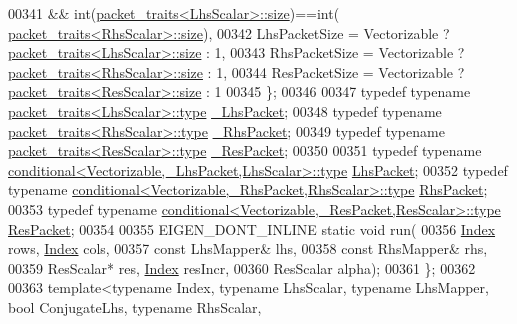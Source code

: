 \begin{DoxyCode}
{00341               && int(\hyperlink{struct_eigen_1_1internal_1_1packet__traits}{packet\_traits<LhsScalar>::size})==int(
      \hyperlink{struct_eigen_1_1internal_1_1packet__traits}{packet\_traits<RhsScalar>::size}),
00342   LhsPacketSize = Vectorizable ? \hyperlink{struct_eigen_1_1internal_1_1packet__traits}{packet\_traits<LhsScalar>::size} : 1,
00343   RhsPacketSize = Vectorizable ? \hyperlink{struct_eigen_1_1internal_1_1packet__traits}{packet\_traits<RhsScalar>::size} : 1,
00344   ResPacketSize = Vectorizable ? \hyperlink{struct_eigen_1_1internal_1_1packet__traits}{packet\_traits<ResScalar>::size} : 1
00345 \};
00346 
00347 \textcolor{keyword}{typedef} \textcolor{keyword}{typename} \hyperlink{group___sparse_core___module}{packet\_traits<LhsScalar>::type}  
      \hyperlink{group___sparse_core___module}{\_LhsPacket};
00348 \textcolor{keyword}{typedef} \textcolor{keyword}{typename} \hyperlink{group___sparse_core___module}{packet\_traits<RhsScalar>::type}  
      \hyperlink{group___sparse_core___module}{\_RhsPacket};
00349 \textcolor{keyword}{typedef} \textcolor{keyword}{typename} \hyperlink{group___sparse_core___module}{packet\_traits<ResScalar>::type}  
      \hyperlink{group___sparse_core___module}{\_ResPacket};
00350 
00351 \textcolor{keyword}{typedef} \textcolor{keyword}{typename} \hyperlink{class_eigen_1_1internal_1_1_tensor_lazy_evaluator_writable}{conditional<Vectorizable,\_LhsPacket,LhsScalar>::type}
       \hyperlink{class_eigen_1_1internal_1_1_tensor_lazy_evaluator_writable}{LhsPacket};
00352 \textcolor{keyword}{typedef} \textcolor{keyword}{typename} \hyperlink{class_eigen_1_1internal_1_1_tensor_lazy_evaluator_writable}{conditional<Vectorizable,\_RhsPacket,RhsScalar>::type}
       \hyperlink{class_eigen_1_1internal_1_1_tensor_lazy_evaluator_writable}{RhsPacket};
00353 \textcolor{keyword}{typedef} \textcolor{keyword}{typename} \hyperlink{class_eigen_1_1internal_1_1_tensor_lazy_evaluator_writable}{conditional<Vectorizable,\_ResPacket,ResScalar>::type}
       \hyperlink{class_eigen_1_1internal_1_1_tensor_lazy_evaluator_writable}{ResPacket};
00354 
00355 EIGEN\_DONT\_INLINE \textcolor{keyword}{static} \textcolor{keywordtype}{void} run(
00356   \hyperlink{namespace_eigen_a62e77e0933482dafde8fe197d9a2cfde}{Index} rows, \hyperlink{namespace_eigen_a62e77e0933482dafde8fe197d9a2cfde}{Index} cols,
00357   \textcolor{keyword}{const} LhsMapper& lhs,
00358   \textcolor{keyword}{const} RhsMapper& rhs,
00359         ResScalar* res, \hyperlink{namespace_eigen_a62e77e0933482dafde8fe197d9a2cfde}{Index} resIncr,
00360   ResScalar alpha);
00361 \};
00362 
00363 \textcolor{keyword}{template}<\textcolor{keyword}{typename} Index, \textcolor{keyword}{typename} LhsScalar, \textcolor{keyword}{typename} LhsMapper, \textcolor{keywordtype}{bool} ConjugateLhs, \textcolor{keyword}{typename} RhsScalar, \textcolor{keyword}{
}}
\end{DoxyCode}
